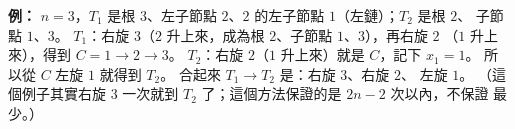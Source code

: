 \begin{pastsoln}
\textbf{例：} $n = 3$，$T_1$ 是根 $3$、左子節點 $2$、$2$ 的左子節點 $1$（左鏈）；$T_2$ 是根 $2$、
子節點 $1$、$3$。 $T_1$：右旋 $3$（$2$ 升上來，成為根 $2$、子節點 $1$、$3$），再右旋 $2$
（$1$ 升上來），得到 $C = 1 \to 2 \to 3$。 $T_2$：右旋 $2$（$1$ 升上來）就是 $C$，記下
$x_1 = 1$。 所以從 $C$ 左旋 $1$ 就得到 $T_2$。 合起來 $T_1 \to T_2$ 是：右旋 $3$、右旋 $2$、
左旋 $1$。 （這個例子其實右旋 $3$ 一次就到 $T_2$ 了；這個方法保證的是 $2n - 2$ 次以內，不保證
最少。）
\end{pastsoln}
